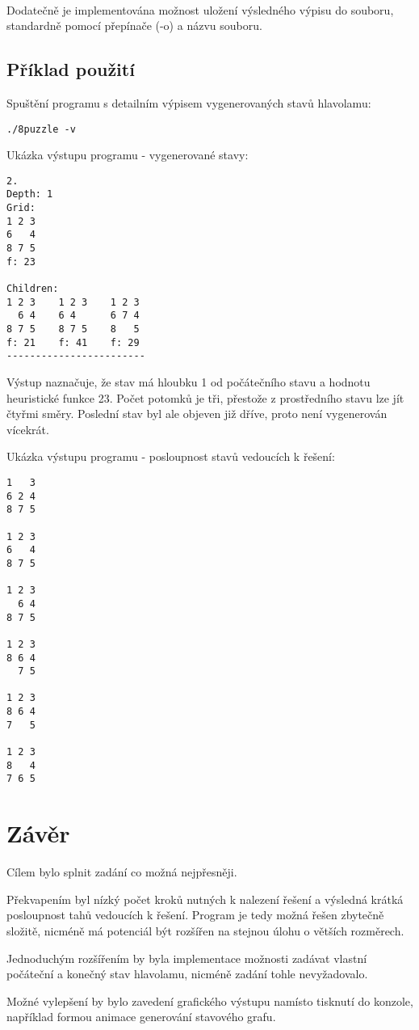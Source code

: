 \documentclass[12pt]{article}
\begin{document}
\paragraph{}
Dodatečně je implementována možnost uložení výsledného výpisu do souboru,
standardně pomocí přepínače (-o) a názvu souboru.

\clearpage
\subsection{Příklad použití}
Spuštění programu s detailním výpisem vygenerovaných stavů hlavolamu:
\begin{verbatim}
./8puzzle -v
\end{verbatim}
Ukázka výstupu programu - vygenerované stavy:
\begin{verbatim}
2.
Depth: 1
Grid:
1 2 3 
6   4 
8 7 5 
f: 23

Children:
1 2 3    1 2 3    1 2 3    
  6 4    6 4      6 7 4    
8 7 5    8 7 5    8   5    
f: 21    f: 41    f: 29    
------------------------
\end{verbatim}
Výstup naznačuje, že stav má hloubku 1 od počátečního stavu a hodnotu
heuristické funkce 23. Počet potomků je tři, přestože z prostředního stavu lze
jít čtyřmi směry. Poslední stav byl ale objeven již dříve, proto není
vygenerován vícekrát.

\clearpage
\noindent
Ukázka výstupu programu - posloupnost stavů vedoucích k řešení:
\begin{verbatim}
1   3 
6 2 4 
8 7 5 

1 2 3 
6   4 
8 7 5 

1 2 3 
  6 4 
8 7 5 

1 2 3 
8 6 4 
  7 5 

1 2 3 
8 6 4 
7   5 

1 2 3 
8   4 
7 6 5
\end{verbatim}

\section{Závěr}
Cílem bylo splnit zadání co možná nejpřesněji. 

Překvapením byl nízký počet kroků nutných k nalezení řešení a výsledná krátká
posloupnost tahů vedoucích k řešení. Program je tedy možná řešen zbytečně
složitě, nicméně má potenciál být rozšířen na stejnou úlohu o větších
rozměrech.

Jednoduchým rozšířením by byla implementace možnosti zadávat vlastní počáteční
a konečný stav hlavolamu, nicméně zadání tohle nevyžadovalo.

Možné vylepšení by bylo zavedení grafického výstupu namísto tisknutí do
konzole, například formou animace generování stavového grafu.
\end{document}
